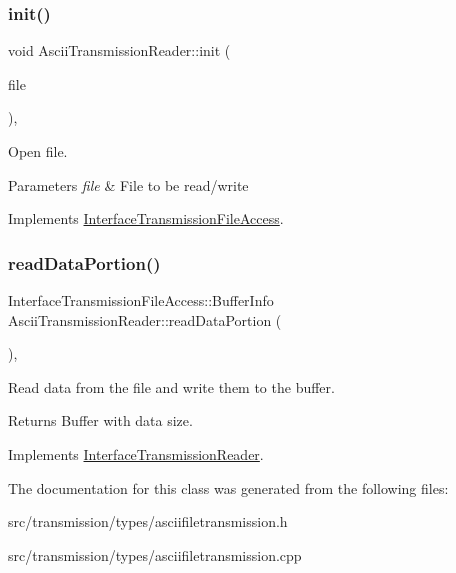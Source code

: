 \subsubsection{\texorpdfstring{init()}{init()}}
{\footnotesize\ttfamily void Ascii\+Transmission\+Reader\+::init (\begin{DoxyParamCaption}\item[{const Q\+File \&}]{file }\end{DoxyParamCaption})\hspace{0.3cm}{\ttfamily [override]}, {\ttfamily [virtual]}}



Open file. 


\begin{DoxyParams}{Parameters}
{\em file} & File to be read/write \\
\hline
\end{DoxyParams}


Implements \hyperlink{classInterfaceTransmissionFileAccess_a8c423ccb527b1dda62c798a75b6eb690}{Interface\+Transmission\+File\+Access}.

\mbox{\label{classAsciiTransmissionReader_a5fd477415e273e4943caac08e8b0a7e5}} 
\subsubsection{\texorpdfstring{read\+Data\+Portion()}{readDataPortion()}}
{\footnotesize\ttfamily Interface\+Transmission\+File\+Access\+::\+Buffer\+Info Ascii\+Transmission\+Reader\+::read\+Data\+Portion (\begin{DoxyParamCaption}{ }\end{DoxyParamCaption})\hspace{0.3cm}{\ttfamily [override]}, {\ttfamily [virtual]}}



Read data from the file and write them to the buffer. 

\begin{DoxyReturn}{Returns}
Buffer with data size. 
\end{DoxyReturn}


Implements \hyperlink{classInterfaceTransmissionReader_ab8733fbc3a4f6dc8279c363212fd3f51}{Interface\+Transmission\+Reader}.



The documentation for this class was generated from the following files\+:\begin{DoxyCompactItemize}
\item 
src/transmission/types/asciifiletransmission.\+h\item 
src/transmission/types/asciifiletransmission.\+cpp\end{DoxyCompactItemize}
